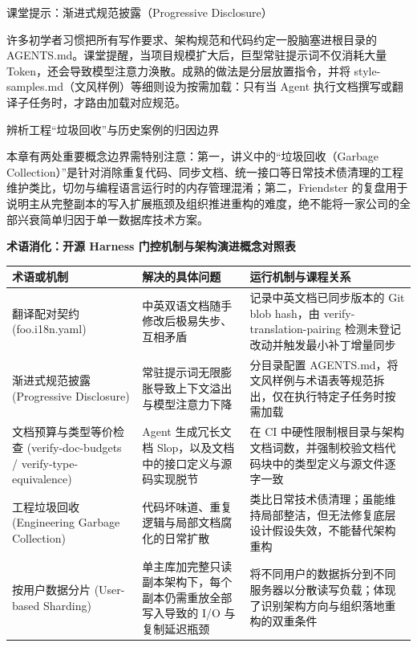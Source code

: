 \documentclass[UTF8,a4paper,11pt,fontset=fandol]{ctexart}
\begin{document}
\begin{knowledgebox}{课堂提示：渐进式规范披露（Progressive Disclosure）}

许多初学者习惯把所有写作要求、架构规范和代码约定一股脑塞进根目录的 AGENTS.md。课堂提醒，当项目规模扩大后，巨型常驻提示词不仅消耗大量 Token，还会导致模型注意力涣散。成熟的做法是分层放置指令，并将 style-samples.md（文风样例）等细则设为按需加载：只有当 Agent 执行文档撰写或翻译子任务时，才路由加载对应规范。

\end{knowledgebox}

\begin{warningbox}{辨析工程“垃圾回收”与历史案例的归因边界}

本章有两处重要概念边界需特别注意：第一，讲义中的“垃圾回收（Garbage Collection）”是针对消除重复代码、同步文档、统一接口等日常技术债清理的工程维护类比，切勿与编程语言运行时的内存管理混淆；第二，Friendster 的复盘用于说明主从完整副本的写入扩展瓶颈及组织推进重构的难度，绝不能将一家公司的全部兴衰简单归因于单一数据库技术方案。

\end{warningbox}

\par{}\textbf{术语消化：开源 Harness 门控机制与架构演进概念对照表}

\begin{center}\small\begin{tabularx}{\linewidth}{YYY}

\toprule

术语或机制 & 解决的具体问题 & 运行机制与课程关系\\\midrule

翻译配对契约 (foo.i18n.yaml) & 中英双语文档随手修改后极易失步、互相矛盾 & 记录中英文档已同步版本的 Git blob hash，由 verify-translation-pairing 检测未登记改动并触发最小补丁增量同步\\[3pt]

渐进式规范披露 (Progressive Disclosure) & 常驻提示词无限膨胀导致上下文溢出与模型注意力下降 & 分目录配置 AGENTS.md，将文风样例与术语表等规范拆出，仅在执行特定子任务时按需加载\\[3pt]

文档预算与类型等价检查 (verify-doc-budgets / verify-type-equivalence) & Agent 生成冗长文档 Slop，以及文档中的接口定义与源码实现脱节 & 在 CI 中硬性限制根目录与架构文档词数，并强制校验文档代码块中的类型定义与源文件逐字一致\\[3pt]

工程垃圾回收 (Engineering Garbage Collection) & 代码坏味道、重复逻辑与局部文档腐化的日常扩散 & 类比日常技术债清理；虽能维持局部整洁，但无法修复底层设计假设失效，不能替代架构重构\\[3pt]

按用户数据分片 (User-based Sharding) & 单主库加完整只读副本架构下，每个副本仍需重放全部写入导致的 I/O 与复制延迟瓶颈 & 将不同用户的数据拆分到不同服务器以分散读写负载；体现了识别架构方向与组织落地重构的双重条件\\[3pt]

\bottomrule\end{tabularx}\end{center}
\end{document}
